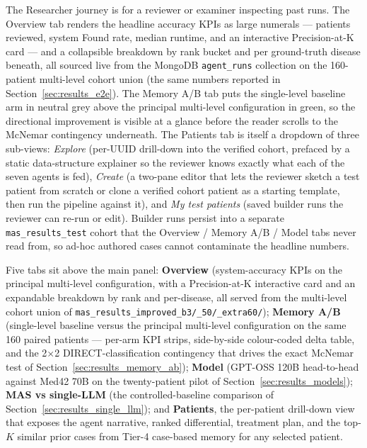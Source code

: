 The Researcher journey is for a reviewer or examiner inspecting past runs.
The Overview tab renders the headline accuracy KPIs as large numerals ---
patients reviewed, system Found rate, median runtime, and an interactive
Precision-at-K card --- and a collapsible breakdown by rank bucket and
per ground-truth disease beneath, all sourced live from the MongoDB
\texttt{agent\_runs} collection on the 160-patient multi-level cohort
union (the same numbers reported in Section~\ref{sec:results_e2e}). The
Memory A/B tab puts the single-level baseline arm in neutral grey above
the principal multi-level configuration in green, so the directional
improvement is visible at a glance before the reader scrolls to the
McNemar contingency underneath. The Patients tab is itself a dropdown
of three sub-views: \emph{Explore} (per-UUID drill-down into the
verified cohort, prefaced by a static data-structure explainer so the
reviewer knows exactly what each of the seven agents is fed),
\emph{Create} (a two-pane editor that lets the reviewer sketch a test
patient from scratch or clone a verified cohort patient as a starting
template, then run the pipeline against it), and \emph{My test
patients} (saved builder runs the reviewer can re-run or edit). Builder
runs persist into a separate \texttt{mas\_results\_test} cohort that
the Overview / Memory A/B / Model tabs never read from, so ad-hoc
authored cases cannot contaminate the headline numbers.

Five tabs sit above the main panel:
\textbf{Overview} (system-accuracy KPIs on the principal multi-level
configuration, with a Precision-at-K interactive card and an expandable
breakdown by rank and per-disease, all served from the multi-level cohort
union of \texttt{mas\_results\_improved\_b3/\_50/\_extra60/});
\textbf{Memory A/B} (single-level baseline versus the principal
multi-level configuration on the same 160 paired patients --- per-arm KPI
strips, side-by-side colour-coded delta table, and the 2$\times$2
DIRECT-classification contingency that drives the exact McNemar test of
Section~\ref{sec:results_memory_ab});
\textbf{Model} (GPT-OSS 120B head-to-head against Med42 70B on the
twenty-patient pilot of Section~\ref{sec:results_models});
\textbf{MAS vs single-LLM} (the controlled-baseline comparison of
Section~\ref{sec:results_single_llm});
and \textbf{Patients}, the per-patient drill-down view that exposes the
agent narrative, ranked differential, treatment plan, and the top-$K$
similar prior cases from Tier-4 case-based memory for any selected
patient.


